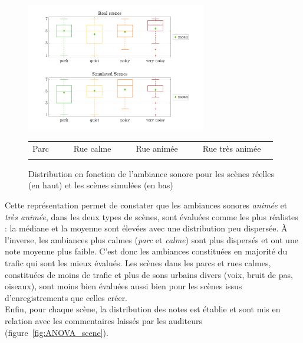 \begin{figure}[hbtp]
\centering
\includegraphics[width=0.7\textwidth]{./figures/test_perceptif/testPerceptif_boxplotAmbianceCOLOR_EN.pdf}

\begin{tabular}{|p{1.5cm}|l|p{0.001cm}|p{2cm}|l|p{0.001cm}|p{2cm}|l|p{0.001cm}|p{2.75cm}|l|}
\hhline{|-|-|~|-|-|~|-|-|~|-|-|}
Parc & {\cellcolor[HTML]{5AB25A}} & & Rue calme & {\cellcolor[HTML]{FFCB2F}} & & Rue animée & {\cellcolor[HTML]{F56B00}} & &  Rue très animée & {\cellcolor[HTML]{9A0000}}\\
\hhline{|-|-|~|-|-|~|-|-|~|-|-|}
\end{tabular}

\caption{Distribution en fonction de l'ambiance sonore pour les scènes réelles (en haut) et les scènes simulées (en bas)}
\label{fig:boxplot_ambiance}
\end{figure}

 
Cette représentation permet de constater que les ambiances sonores \textit{animée} et \textit{très animée}, dans les deux types de scènes, sont évaluées comme les plus réalistes : la médiane et la moyenne sont élevées avec une distribution peu dispersée. \`A l'inverse, les ambiances plus calmes (\textit{parc} et \textit{calme}) sont plus dispersés et ont une note moyenne plus faible. C'est donc les ambiances constituées en majorité du trafic qui sont les mieux évalués. Les scènes dans les parcs et rues calmes, constituées de moins de trafic et plus de sons urbains divers (voix, bruit de pas, oiseaux), sont moins bien évaluées aussi bien pour les scènes issus d'enregistrements que celles créer.\\

Enfin, pour chaque scène, la distribution des notes est établie et sont mis en relation avec les commentaires laissés par les auditeurs (figure~\ref{fig:ANOVA_scene}).\\

